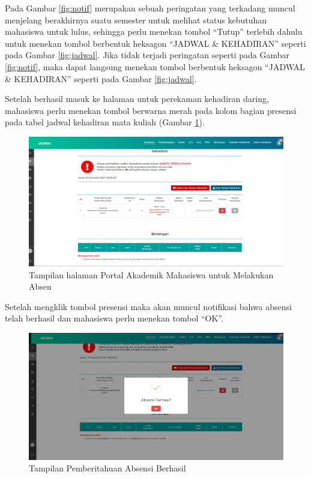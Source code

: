 Pada Gambar \ref{fig:notif} merupakan sebuah peringatan yang terkadang muncul menjelang berakhirnya suatu semester untuk melihat status kebutuhan mahasiswa untuk lulus, sehingga perlu menekan tombol ``Tutup'' terlebih dahulu untuk menekan tombol berbentuk heksagon ``JADWAL \& KEHADIRAN'' seperti pada Gambar \ref{fig:jadwal}. Jika tidak terjadi peringatan seperti pada  Gambar \ref{fig:notif}, maka dapat langsung menekan tombol berbentuk heksagon ``JADWAL \& KEHADIRAN'' seperti pada Gambar \ref{fig:jadwal}.

Setelah berhasil masuk ke halaman untuk perekaman kehadiran daring, mahasiswa perlu menekan tombol berwarna merah pada kolom bagian presensi pada tabel jadwal kehadiran mata kuliah (Gambar \ref{fig:absen}). 	
\begin{figure}[H]
	\centering
	\includegraphics[scale=0.225]{Gambar/absen.jpg}
	\caption{Tampilan halaman Portal Akademik Mahasiswa untuk Melakukan Absen} 
	\label{fig:absen}
\end{figure}

Setelah mengklik tombol presensi maka akan muncul notifikasi bahwa absensi telah berhasil dan mahasiswa perlu menekan tombol ``OK''. 
\begin{figure}[H]
	\centering
	\includegraphics[scale=0.225]{Gambar/berhasilAbsen.jpg}
	\caption{Tampilan Pemberitahuan Absensi Berhasil} 
	\label{fig:berhasil}
\end{figure}

